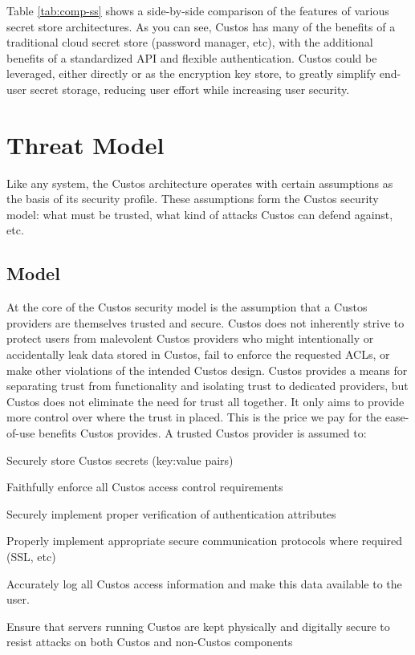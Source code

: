 Table \ref{tab:comp-ss} shows a side-by-side comparison of the
features of various secret store architectures. As you can see, Custos
has many of the benefits of a traditional cloud secret store (password
manager, etc), with the additional benefits of a standardized API and
flexible authentication. Custos could be leveraged, either directly or
as the encryption key store, to greatly simplify end-user secret
storage, reducing user effort while increasing user security.

\section{Threat Model}

Like any system, the Custos architecture operates with certain
assumptions as the basis of its security profile. These assumptions
form the Custos security model: what must be trusted, what kind of
attacks Custos can defend against, etc.

\subsection{Model}

At the core of the Custos security model is the assumption that a
Custos providers are themselves trusted and secure. Custos does not
inherently strive to protect users from malevolent Custos providers
who might intentionally or accidentally leak data stored in Custos,
fail to enforce the requested ACLs, or make other violations of the
intended Custos design. Custos provides a means for separating trust
from functionality and isolating trust to dedicated providers, but
Custos does not eliminate the need for trust all together. It only
aims to provide more control over where the trust in placed. This is
the price we pay for the ease-of-use benefits Custos provides. A
trusted Custos provider is assumed to:

\begin{packed_item}
\item Securely store Custos secrets (key:value pairs)
\item Faithfully enforce all Custos access control requirements
\item Securely implement proper verification of authentication attributes
\item Properly implement appropriate secure communication protocols where
  required (SSL, etc)
\item Accurately log all Custos access information and make this data
  available to the user.
\item Ensure that servers running Custos are kept physically and
  digitally secure to resist attacks on both Custos and non-Custos
  components
\end{packed_item}

